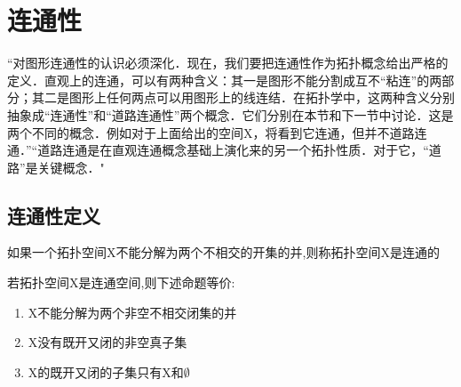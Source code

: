 \section{连通性}
“对图形连通性的认识必须深化．现在，我们要把连通性作为拓扑概念给出严格的定义．直观上的连通，可以有两种含义：其一是图形不能分割成互不“粘连”的两部分；其二是图形上任何两点可以用图形上的线连结．在拓扑学中，这两种含义分别抽象成“连通性”和“道路连通性”两个概念．它们分别在本节和下一节中讨论．这是两个不同的概念．例如对于上面给出的空间X，将看到它连通，但并不道路连通．”“道路连通是在直观连通概念基础上演化来的另一个拓扑性质．对于它，“道路”是关键概念．"
\subsection*{连通性定义}
\begin{definition}
    如果一个拓扑空间X不能分解为两个不相交的开集的并,则称拓扑空间X是连通的
\end{definition}
\begin{corollary}
    若拓扑空间X是连通空间,则下述命题等价: 
    \begin{enumerate}
        \item X不能分解为两个非空不相交闭集的并 \\
        \item X没有既开又闭的非空真子集 \\
        \item X的既开又闭的子集只有X和\(\emptyset\)
    \end{enumerate}
\end{corollary}

